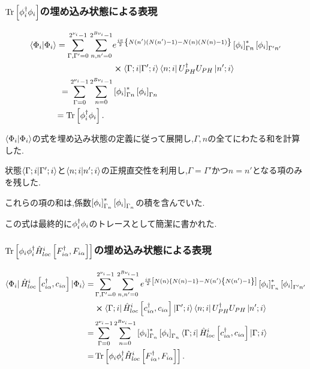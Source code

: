 \subsubsection{$\Tr \left[ \phi^\dagger_{i}\phi_{i} \right]$の埋め込み状態による表現}
\begin{equation}
\begin{split}
    \braket{\Phi_{i}}=\sum_{\Gamma,\Gamma'=0}^{2^{\nu_{i}}-1}\sum_{n,n'=0}^{2^{B\nu_{i}}-1}&e^{\frac{i\pi}{2}\left \{ N(n')(N(n')-1)-N(n)(N(n)-1) \right\}}\left[ \phi_{i} \right]^*_{\Gamma n}\left[ \phi_{i} \right]_{\Gamma'n'}\\
    &\cross \braket{\Gamma;i}{\Gamma';i}\Bra{n;i}U^\dagger_{PH}U_{PH}\Ket{n';i}\\
    =\sum_{\Gamma=0}^{2^{\nu_{i}}-1}\sum_{n=0}^{2^{B\nu_{i}}-1}&\left[ \phi_{i} \right]^*_{\Gamma n}\left[ \phi_{i} \right]_{\Gamma{n}}\\
    =\Tr \left[ \phi_{i}^\dagger\phi_{i} \right].\quad 
\end{split}
\end{equation}

$\braket{\Phi_{i}}$の式を埋め込み状態の定義に従って展開し,$\Gamma,n$の全てにわたる和を計算した.

状態$\braket{\Gamma;i}{\Gamma';i}$と$\braket{n;i}{n';i}$の正規直交性を利用し,$\Gamma=\Gamma'$かつ$n=n'$となる項のみを残した.

これらの項の和は,係数$\left[ \phi_{i} \right]^*_{\Gamma_{n}}\left[ \phi_{i} \right]_{\Gamma_{n}}$の積を含んでいた.

この式は最終的に$\phi^\dagger_{i}\phi_{i}$のトレースとして簡潔に書かれた.

\subsubsection{$\Tr \left[ \phi_{i}\phi^\dagger_{i}\hat{H}^{i}_{loc}\left[ F^\dagger_{i\alpha},F_{i\alpha} \right] \right]$の埋め込み状態による表現}

\begin{equation}
\begin{split}
    \Bra{\Phi_{i}}\hat{H}^{i}_{loc}\left[ c^\dagger_{i\alpha},c_{i\alpha} \right]\Ket{\Phi_{i}}=&\sum_{\Gamma,\Gamma'=0}^{2^{\nu_{i}}-1}\sum_{n,n'=0}^{2^{B\nu_{i}}-1}e^{\frac{i\pi}{2}\left[ N(n)\left \{ N(n)-1 \right\}-N(n')\left \{ N(n')-1 \right\} \right]}\left[ \phi_{i} \right]^*_{\Gamma_{n}}\left[ \phi_{i} \right]_{\Gamma'n'}\\
    &\cross \Bra{\Gamma;i}\hat{H}^{i}_{loc}\left[ c^\dagger_{i\alpha},c_{i\alpha} \right]\Ket{\Gamma';i}\Bra{n;i}U^\dagger_{PH}U_{PH}\Ket{n';i}\\
    =&\sum_{\Gamma=0}^{2^{\nu_{i}}-1}\sum_{n=0}^{2^{B\nu_{i}}-1}\left[ \phi_{i} \right]^*_{\Gamma_{n}}\left[ \phi_{i} \right]_{\Gamma_{n}}\Bra{\Gamma;i}\hat{H}^{i}_{loc}\left[ c^\dagger_{i\alpha},c_{i\alpha} \right]\Ket{\Gamma;i}\\
    =&\Tr \left[ \phi_{i}\phi^\dagger_{i}\hat{H}^{i}_{loc}\left[ F^\dagger_{i\alpha},F_{i\alpha} \right] \right].
\end{split}
\end{equation}

